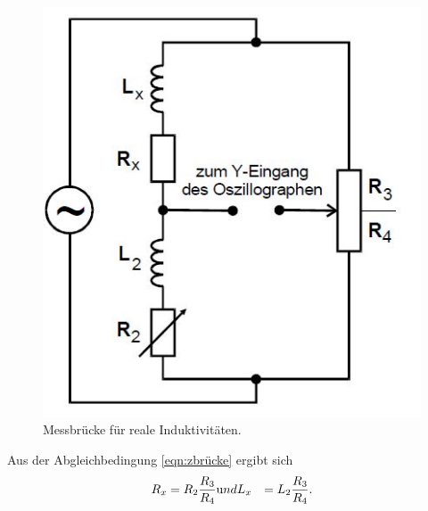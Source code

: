 \begin{figure}[H]
  \centeribg
  \includegraphics{induktivitat.JPG}
  \caption{Messbrücke für reale Induktivitäten.}
  \label{fig:induktivitat}
\end{figure}
Aus der Abgleichbedingung \ref{eqn:zbrücke} ergibt sich
\begin{align}
  R_{x} &=R_{2}\frac{R_{3}}{R_{4}} \text und
  L_{x} &=L_{2}\frac{R_{3}}{R_{4}}.
\end{align}







\label{sec:Theorie}

